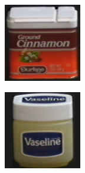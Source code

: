 \begin{figure}[tbp]
\begin{subfigure}{80pt}
    \caption{}
	\end{subfigure}
	\begin{subfigure}{80pt}
        \centering
    \includegraphics[width=\textwidth]{figures/coil_original/39.png}
    \caption{}
	\end{subfigure}
	\begin{subfigure}{80pt}
        \centering
    \includegraphics[width=\textwidth]{figures/coil_original/55.png}

\end{subfigure}
\end{figure}
